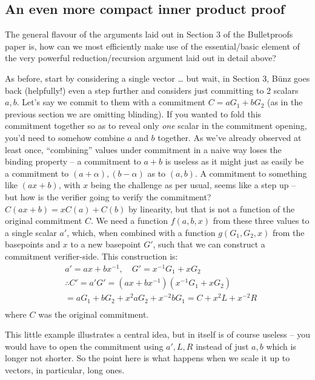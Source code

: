 \documentclass[10pt,a4paper]{article}
\begin{document}
\hypertarget{an-even-more-compact-inner-product-proof}{%
\subsection[An even more compact inner product
proof]{\texorpdfstring{\protect\hypertarget{anchor-49}{}{}An even more
compact inner product
proof}{An even more compact inner product proof}}\label{an-even-more-compact-inner-product-proof}}

The general flavour of the arguments laid out in Section 3 of the
Bulletproofs paper is, how can we most efficiently make use of the
essential/basic element of the very powerful reduction/recursion
argument laid out in detail above?

As before, start by considering a single vector \ldots{} but wait, in
Section 3, Bünz goes back (helpfully!) even a step further and considers
just committing to 2 scalars $a, b$. Let's say we commit to them with a
commitment $C = aG_1 + bG_2$ (as in the previous section we are omitting blinding). If you
wanted to fold this commitment together so as to reveal only \emph{one}
scalar in the commitment opening, you'd need to somehow combine $a$ and $b$
together. As we've already observed at least once, ``combining'' values
under commitment in a naive way loses the binding property -- a
commitment to $a+b$ is useless as it might just as easily be a commitment to
$(a+\alpha), (b-\alpha)$ as to $(a, b)$. A commitment to something like $(ax+b)$, with $x$ being the challenge as per
usual, seems like a step up -- but how is the verifier going to verify
the commitment? $C(ax+b) = xC(a) + C(b)$ by linearity, but that is not a function of the original
commitment $C$. We need a function $f(a, b, x)$ from these three values to a single
scalar $a'$, which, when combined with a function $g(G_1, G_2, x)$ from the basepoints and $x$ to
a new basepoint $G'$, such that we can construct a commitment verifier-side.
This construction is:
\begin{align*}
& a' = ax + bx^{-1},\quad G' = x^{-1}G_1 + xG_2 \\
& \therefore C' = a'G' = \left(ax+bx^{-1}\right)\left(x^{-1}G_1 + xG_2\right) \\
& = aG_1 + bG_2 + x^2aG_2 + x^{-2}bG_1 = C + x^2L + x^{-2}R \\
\end{align*}
where $C$ was the original commitment.

This little example illustrates a central idea, but in itself is of
course useless -- you would have to open the commitment using $a', L, R$ instead of
just $a, b$ which is longer not shorter. So the point here is what happens when
we scale it up to vectors, in particular, long ones.
\end{document}
